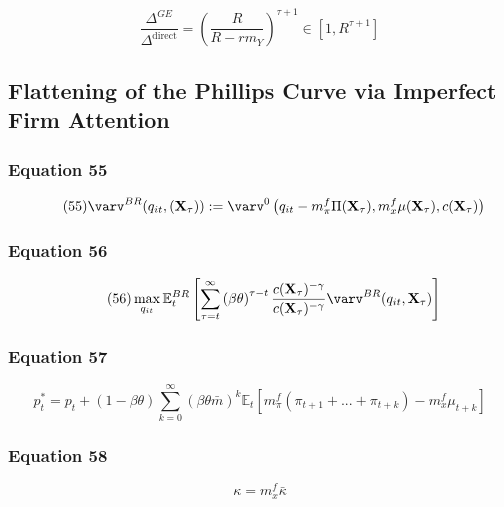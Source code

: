 \documentclass{article}
\begin{document}
\begin{equation}\tag{54}
    \frac{\Delta^{GE}}{\Delta^{\text{direct}}}=\left(\frac{R}{R-rm_{Y}}\right)^{\tau+1}\in\left[1, R^{\tau+1}\right]
\end{equation}

\subsection{Flattening of the Phillips Curve via Imperfect Firm Attention}

\subsubsection*{Equation 55}

\begin{equation}\tag{55}
    \varv^{BR}(q_{it},(\textbf{X}_{\tau})):=\varv^{0}\left(q_{it}-m^{f}_{\pi}\Pi(\textbf{X}_{\tau}),m^{f}_{x}\mu(\textbf{X}_{\tau}),c(\textbf{X}_{\tau})\right)
\end{equation}

\subsubsection*{Equation 56}

\begin{equation}\tag{56}
    \max_{q_{it}}{\mathbb{E}_{t}^{BR}\left[\sum_{\tau=t}^{\infty}\left(\beta\theta\right)^{\tau-t}\frac{c(\textbf{X}_{\tau})^{-\gamma}}{c(\textbf{X}_{\tau})^{-\gamma}}\varv^{BR}(q_{it},\textbf{X}_{\tau})\right]}
\end{equation}

\subsubsection*{Equation 57}

\begin{equation}\tag{57}
    p^{*}_{t}=p_{t}+(1-\beta\theta)\sum^{\infty}_{k=0} \left(\beta\theta\bar{m}\right)^{k}\mathbb{E}_{t}\left[m^{f}_{\pi}(\pi_{t+1}+...+\pi_{t+k})-m^{f}_{x}\mu_{t+k}\right]
\end{equation}

\subsubsection*{Equation 58}

\begin{equation}\tag{58}
    \kappa = m^{f}_{x}\bar{\kappa}
\end{equation}
\end{document}
